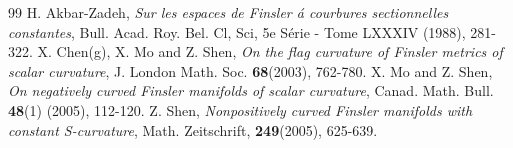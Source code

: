 \documentclass[10pt,a4paper]{amsart}
\begin{document}
\begin{thebibliography}{99}
 H. Akbar-Zadeh, {\it Sur les espaces de Finsler \'{a} courbures sectionnelles constantes}, Bull. Acad. Roy. Bel. Cl, Sci, 5e S\'{e}rie - Tome LXXXIV (1988), 281-322. %
 X. Chen(g), X. Mo and Z. Shen, {\it On the flag curvature of Finsler metrics of scalar curvature}, J. London Math. Soc. {\bf 68}(2003), 762-780. %
 X. Mo and Z. Shen, {\it On negatively curved Finsler manifolds of scalar curvature}, Canad. Math. Bull. {\bf 48}(1) (2005), 112-120. %
 Z. Shen, {\it Nonpositively curved Finsler manifolds with constant S-curvature}, Math. Zeitschrift, {\bf 249}(2005), 625-639. %
\end{thebibliography}
\end{document}

